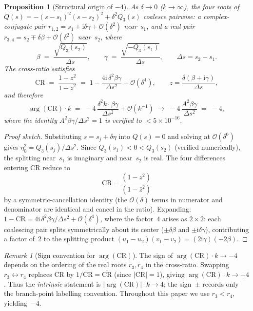 \documentclass[11pt,a4paper]{article}
\theoremstyle{plain}
\newtheorem{proposition}[theorem]{Proposition}
\theoremstyle{definition}
\theoremstyle{remark}
\newtheorem{remark}[theorem]{Remark}
\newcommand{\ii}{\mathrm{i}}
\newcommand{\abs}[1]{\lvert #1 \rvert}
\newcommand{\Oo}{\mathcal{O}}
\begin{document}
\begin{proposition}[Structural origin of $-4$]
\label{prop:arg-4}
As $\delta \to 0$ ($k \to \infty$), the four roots of
$Q(s) = -(s - s_1)^2(s - s_2)^2 + \delta^2 Q_3(s)$ coalesce
pairwise: a complex-conjugate pair
$r_{1,2} = s_1 \pm \ii\delta\gamma + \Oo(\delta^2)$
near~$s_1$, and a real pair
$r_{3,4} = s_2 \mp \delta\beta + \Oo(\delta^2)$ near~$s_2$, where
\begin{equation}\label{eq:beta-gamma}
  \beta \;=\; \frac{\sqrt{Q_3(s_2)}}{\Delta s},
  \qquad
  \gamma \;=\; \frac{\sqrt{-Q_3(s_1)}}{\Delta s},
  \qquad
  \Delta s = s_2 - s_1.
\end{equation}
The cross-ratio satisfies
\begin{equation}\label{eq:CR-expansion}
  \mathrm{CR} \;=\;
  \frac{1 - z^2}{1 - \bar z^2}
  \;=\; 1 - \frac{4\ii\,\delta^2\beta\gamma}{\Delta s^2}
         + \Oo(\delta^4),
  \qquad z = \frac{\delta(\beta + \ii\gamma)}{\Delta s},
\end{equation}
and therefore
\[
  \arg(\mathrm{CR}) \cdot k
  \;=\; -4\,\frac{\delta^2 k \cdot \beta\gamma}{\Delta s^2}
         + \Oo(k^{-1})
  \;\longrightarrow\;
  -4\,\frac{A^2 \beta\gamma}{\Delta s^2}
  \;=\; -4,
\]
where the identity
$A^2\beta\gamma / \Delta s^2 = 1$
is verified to $< 5 \times 10^{-16}$.
\end{proposition}

\begin{proof}[Proof sketch]
Substituting $s = s_j + \delta\eta$ into $Q(s) = 0$ and solving
at $\Oo(\delta^0)$ gives $\eta_0^2 = Q_3(s_j) / \Delta s^2$.
Since $Q_3(s_1) < 0 < Q_3(s_2)$
(verified numerically), the splitting near~$s_1$ is imaginary
and near~$s_2$ is real.
The four differences entering $\mathrm{CR}$
reduce to
\[
  \mathrm{CR} = \frac{(1-z^2)}{(1-\bar z^2)}
\]
by a symmetric-cancellation identity (the $\Oo(\delta)$ terms in numerator
and denominator are identical and cancel in the ratio).
Expanding: $1 - \mathrm{CR} = 4\ii\,\delta^2\beta\gamma / \Delta s^2
+ \Oo(\delta^4)$, where the factor~$4$
arises as $2 \times 2$: each coalescing pair splits symmetrically about
its center ($\pm \delta\beta$ and $\pm \ii\delta\gamma$),
contributing a factor of~$2$ to the splitting product
$(u_1 - u_2)(v_1 - v_2) = (2\ii\gamma)(-2\beta)$.
\end{proof}

\begin{remark}[Sign convention for $\arg(\mathrm{CR})$]
\label{rem:CR-sign}
The sign of $\arg(\mathrm{CR}) \cdot k \to -4$ depends on the
ordering of the real roots $r_3, r_4$ in the cross-ratio.
Swapping $r_3 \leftrightarrow r_4$ replaces $\mathrm{CR}$ by
$1/\mathrm{CR} = \overline{\mathrm{CR}}$ (since $\abs{\mathrm{CR}} = 1$),
giving $\arg(\mathrm{CR}) \cdot k \to +4$.
Thus the \emph{intrinsic} statement is
$\lvert\arg(\mathrm{CR})\rvert \cdot k \to 4$;
the sign~$\pm$ records only the branch-point labelling convention.
Throughout this paper we use $r_3 < r_4$, yielding~$-4$.
\end{remark}
\end{document}
